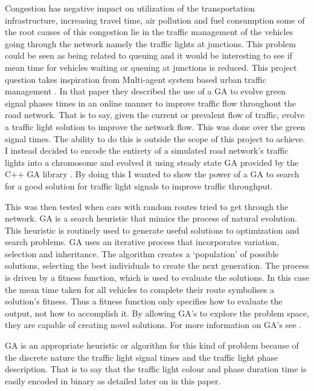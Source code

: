 \documentclass[a4paper,10pt]{article}
\begin{document}
Congestion has negative impact on utilization of the transportation infrastructure, increasing travel time, air pollution and fuel 
consumption some of the root causes of this congestion lie in the traffic management of the vehicles going through the network namely
the traffic lights at junctions. This problem could be seen as being related to queuing and it would be interesting to see if mean time 
for vehicles waiting or queuing at junctions is reduced. 
This project question takes inspiration from Multi-agent system based urban traffic management \cite{Multi-agent}. In that paper they 
described the use of a GA to evolve green signal phases times in an online manner to improve traffic flow throughout the road network. 
That is to say, given the current or prevalent flow of traffic, evolve a traffic light solution to improve the network flow. This was
done over the green signal times. The ability to do this is outside the scope of this project to achieve. I instead decided to encode 
the entirety of a simulated road network’s traffic lights into a chromosome and evolved it using steady state GA provided by the C++ 
GA library  \cite{galib}.  By doing this I wanted to show the power of a GA to search for a good solution for traffic light signals to 
improve traffic throughput. 

This was then tested when cars with random routes tried to get through the network. GA is a search heuristic that mimics the process of
natural evolution. This heuristic is routinely used to generate useful solutions to optimization and search problems. GA uses an 
iterative process that incorporates variation, selection and inheritance. The algorithm creates a `population' of possible solutions, 
selecting the best individuals to create the next generation. The process is driven by a fitness function, which is used to evaluate the 
solutions.  In this case the mean time taken for all vehicles to complete their route symbolises a solution's fitness. Thus a fitness 
function only specifies how to evaluate the output, not how to accomplish it. By allowing GA's to explore the problem space, they are 
capable of creating novel solutions. For more information on GA’s see \cite{ANASbook} \cite{GAbook} \cite{IntroGA} \cite{evocomp}.

GA is an appropriate heuristic or algorithm for this kind of problem because of the discrete nature the traffic light signal times and the traffic light phase description. That is to say that the traffic light colour and phase duration time is easily encoded in binary as detailed later on in this paper.
\end{document}
